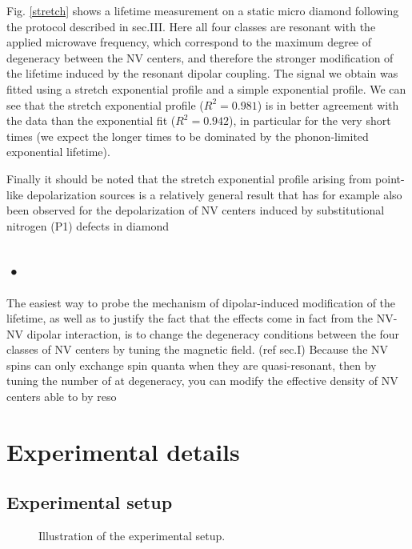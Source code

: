 \documentclass[preprintnumbers,amsmath,amssymb,onecolumn,12pt]{revtex4}
\begin{document}
Fig. \ref{stretch} shows a lifetime measurement on a static micro diamond following the protocol described in sec.III. Here all four classes are resonant with the applied microwave frequency, which correspond to the maximum degree of degeneracy between the NV centers, and therefore the stronger modification of the lifetime induced by the resonant dipolar coupling. The signal we obtain was fitted using a stretch exponential profile  and a simple exponential profile. We can see that the stretch exponential profile ($R^2=0.981$) is in better agreement with the data than the exponential fit ($R^2=0.942$), in particular for the very short times (we expect the longer times to be dominated by the phonon-limited exponential lifetime).

Finally it should be noted that the stretch exponential profile arising from point-like depolarization sources is a relatively general result that has for example also been observed for the depolarization of NV centers induced by substitutional nitrogen (P1) defects in diamond \cite{Hall}

\subsection{•}

The easiest way to probe the mechanism of dipolar-induced modification of the lifetime, as well as to justify the fact that the effects come in fact from the NV-NV dipolar interaction, is to change the degeneracy conditions between the four classes of NV centers by tuning the magnetic field. (ref sec.I)
Because the NV spins can only exchange spin quanta when they are quasi-resonant, then by tuning the number of at degeneracy, you can modify the effective density of NV centers able to by reso
\section{Experimental details}

\subsection{Experimental setup}

\begin{figure}[!ht]
  \centering {}
  \caption{Illustration of the experimental setup.}
	\label{Optics}
\end{figure}
\end{document}
